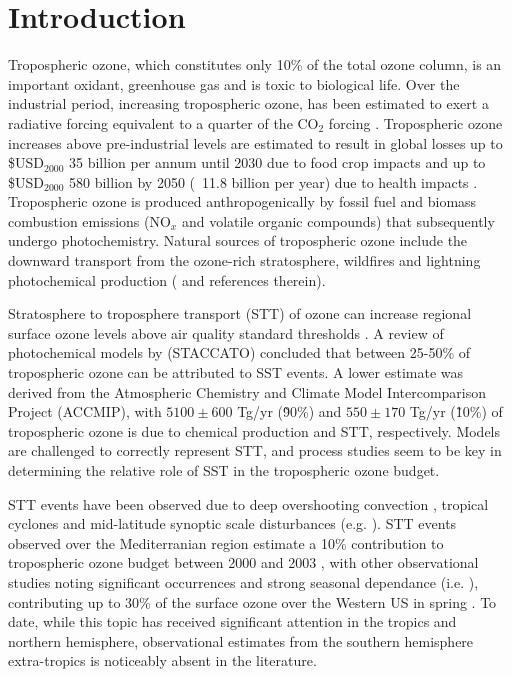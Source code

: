 \documentclass{article}
\begin{document}
\section{Introduction}

    Tropospheric ozone, which constitutes only 10\% of the total ozone column, is an important oxidant, greenhouse gas and is toxic to biological life. 
    Over the industrial period, increasing tropospheric ozone, has been estimated to exert a radiative forcing equivalent to a quarter of the CO$_2$ forcing \citep{IPCC_Chapter2}. Tropospheric ozone increases above pre-industrial levels are estimated to result in global losses up to \$USD$_{2000}$ 35 billion per annum until 2030 due to food crop impacts \citep{Avnery2011} and up to \$USD$_{2000}$ 580 billion by 2050 (~11.8 billion per year) due to health impacts \citep{Selin2009}. Tropospheric ozone is produced anthropogenically by fossil fuel and biomass combustion emissions (NO$_x$ and volatile organic compounds) that subsequently undergo photochemistry. Natural sources of tropospheric ozone include the downward transport from the ozone-rich stratosphere, wildfires and lightning photochemical production (\citet{Jacobson2000} and references therein). 
 
    Stratosphere to troposphere transport (STT) of ozone can increase regional surface ozone levels above air quality standard thresholds \citep{Danielson1968, Lefohn2011, Langford2012, Zhang2014}. A review of photochemical models by \citet{Stohl2003} (STACCATO) concluded that between 25-50\% of tropospheric ozone can be attributed to SST events. A lower estimate was derived from the Atmospheric Chemistry and Climate Model Intercomparison Project (ACCMIP), \citet{Stevenson2006} with $5100\pm600$ Tg/yr (\~90\%) and $550\pm170$ Tg/yr (\~10\%) of tropospheric ozone is due to chemical production and STT, respectively. Models are challenged to correctly represent STT, and process studies seem to be key in determining the relative role of SST in the tropospheric ozone budget.
    
    STT events have been observed due to deep overshooting convection \citep{Frey2015}, tropical cyclones \citep{Das2016} and mid-latitude synoptic scale disturbances (e.g. \citet{Stohl2003,Mihalikova2012}). STT events observed over the Mediterranian region estimate a 10\% contribution to tropospheric ozone budget between 2000 and 2003 \citep{Galani2003}, with other observational studies noting significant occurrences and strong seasonal dependance (i.e. \citet{Lefohn2011}), contributing up to 30\% of the surface ozone over the Western US in spring \citep{Lin2012}. To date, while this topic has received significant attention in the tropics and northern hemisphere, observational estimates from the southern hemisphere extra-tropics is noticeably absent in the literature. 
    
\end{document}
